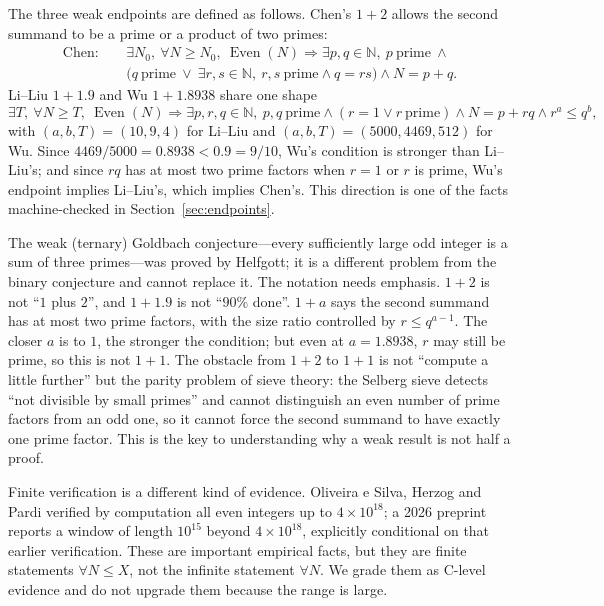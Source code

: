 \documentclass[11pt,a4paper]{article}
\theoremstyle{plain}
\theoremstyle{definition}
\newcommand{\Chen}{\mathrm{Chen}}
\newcommand{\Even}{\operatorname{Even}}
\newcommand{\N}{\mathbb{N}}
\begin{document}
The three weak endpoints are defined as follows. Chen's $1+2$ allows the second summand to be a prime or a product of two primes:
\begin{equation}
\begin{aligned}
\Chen:\quad &\exists N_0,\ \forall N\ge N_0,\ \Even(N)\Longrightarrow
\exists p,q\in\N,\ p\ \text{prime}\ \land\\
&\bigl(q\ \text{prime}\ \lor\ \exists r,s\in\N,\ r,s\ \text{prime}\land q=rs\bigr)
\land N=p+q.
\end{aligned}
\label{eq:chen}
\end{equation}
Li--Liu $1+1.9$ and Wu $1+1.8938$ share one shape
\begin{equation}
\exists T,\ \forall N\ge T,\ \Even(N)\Longrightarrow
\exists p,r,q\in\N,\ p,q\ \text{prime}\land (r=1\lor r\ \text{prime})
\land N=p+rq\land r^{a}\le q^{b},
\label{eq:family}
\end{equation}
with $(a,b,T)=(10,9,4)$ for Li--Liu and $(a,b,T)=(5000,4469,512)$ for Wu\cite{liliu,upstream}. Since $4469/5000=0.8938<0.9=9/10$, Wu's condition is stronger than Li--Liu's; and since $rq$ has at most two prime factors when $r=1$ or $r$ is prime, Wu's endpoint implies Li--Liu's, which implies Chen's. This direction is one of the facts machine-checked in Section~\ref{sec:endpoints}.

The weak (ternary) Goldbach conjecture---every sufficiently large odd integer is a sum of three primes---was proved by Helfgott\cite{helfgott}; it is a different problem from the binary conjecture and cannot replace it. The notation needs emphasis. $1+2$ is not ``$1$ plus $2$'', and $1+1.9$ is not ``$90\%$ done''. $1+a$ says the second summand has at most two prime factors, with the size ratio controlled by $r\le q^{a-1}$. The closer $a$ is to $1$, the stronger the condition; but even at $a=1.8938$, $r$ may still be prime, so this is not $1+1$. The obstacle from $1+2$ to $1+1$ is not ``compute a little further'' but the parity problem of sieve theory: the Selberg sieve detects ``not divisible by small primes'' and cannot distinguish an even number of prime factors from an odd one, so it cannot force the second summand to have exactly one prime factor\cite{montgomery-vaughan}. This is the key to understanding why a weak result is not half a proof.

Finite verification is a different kind of evidence. Oliveira e Silva, Herzog and Pardi verified by computation all even integers up to $4\times10^{18}$\cite{oliveira2014}; a 2026 preprint reports a window of length $10^{15}$ beyond $4\times10^{18}$, explicitly conditional on that earlier verification\cite{llorente2026}. These are important empirical facts, but they are finite statements $\forall N\le X$, not the infinite statement $\forall N$. We grade them as C-level evidence and do not upgrade them because the range is large.
\end{document}
